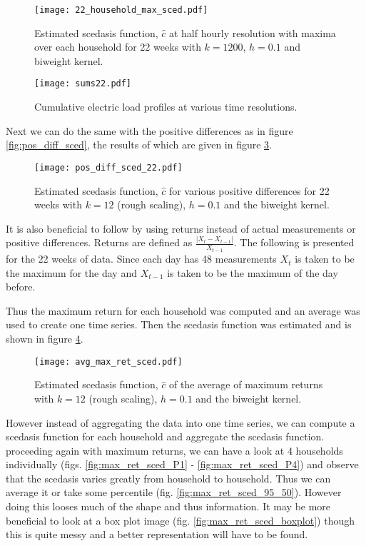 \documentclass[a4paper]{article}
\begin{document}
\begin{figure}
\centering
\texttt{[image: 22\_household\_max\_sced.pdf]}
\caption{\label{fig:mysced_hh_max_22} Estimated scedasis function, $\hat{c}$ at half hourly resolution with maxima over each household for 22 weeks with $k=1200$, $h=0.1$ and biweight kernel.}
\end{figure}

\begin{figure}
\centering
\texttt{[image: sums22.pdf]}
\caption{\label{fig:sums22} Cumulative electric load profiles at various time resolutions.}
\end{figure}

Next we can do the same with the positive differences as in figure \ref{fig:pos_diff_sced}, the results of which are given in figure \ref{fig:pos_diff_sced_22}.

\begin{figure}
\centering
\texttt{[image: pos\_diff\_sced\_22.pdf]}
\caption{\label{fig:pos_diff_sced_22} Estimated scedasis function, $\hat{c}$ for various positive differences for 22 weeks with $k=12$ (rough scaling), $h=0.1$ and the biweight kernel.}
\end{figure}

It is also beneficial to follow \cite{einmahl16} by using returns instead of actual measurements or positive differences. Returns are defined as $\frac{\left|X_t - X_{t-1}\right|}{X_{t-1}}$.  The following is presented for the 22 weeks of data. Since each day has 48 measurements $X_t$ is taken to be the maximum for the day and $X_{t-1}$ is taken to be the maximum of the day before.

Thus the maximum return for each household was computed and an average was used to create one time series. Then the scedasis function was estimated and is shown in figure \ref{fig:avg_max_ret_sced}.

\begin{figure}
\centering
\texttt{[image: avg\_max\_ret\_sced.pdf]}
\caption{\label{fig:avg_max_ret_sced} Estimated scedasis function, $\hat{c}$ of the average of maximum returns with $k=12$ (rough scaling), $h=0.1$ and the biweight kernel.}
\end{figure}


However instead of aggregating the data into one time series, we can compute a scedasis function for each household and aggregate the scedasis function. proceeding again with maximum returns, we can have a look at 4 households individually (figs. \ref{fig:max_ret_sced_P1} - \ref{fig:max_ret_sced_P4}) and observe that the scedasis varies greatly from household to household. Thus we can average it or take some percentile (fig. \ref{fig:max_ret_sced_95_50}). However doing this looses much of the shape and thus information. It may be more beneficial to look at a box plot image (fig. \ref{fig:max_ret_sced_boxplot}) though this is quite messy and a better representation will have to be found.
\end{document}
